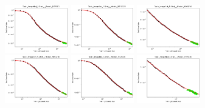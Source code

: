 \documentclass{article} %
\begin{document}

\clearpage

\begin{figure}[]
    \centering

\includegraphics[width=0.245\textwidth]{figures/scaling_laws_benchmark_dataset_plots/few_shot_5___BiT_50_1.png}
\includegraphics[width=0.245\textwidth]{figures/scaling_laws_benchmark_dataset_plots/few_shot_5___BiT_101_3.png}
\includegraphics[width=0.245\textwidth]{figures/scaling_laws_benchmark_dataset_plots/few_shot_5___MiX_B_16.png}
\includegraphics[width=0.245\textwidth]{figures/scaling_laws_benchmark_dataset_plots/few_shot_5___MiX_L_16.png}
\includegraphics[width=0.245\textwidth]{figures/scaling_laws_benchmark_dataset_plots/few_shot_5___ViT_B_16.png}
\includegraphics[width=0.245\textwidth]{figures/scaling_laws_benchmark_dataset_plots/few_shot_5___ViT_S_16.png}

\end{figure}
\end{document}
